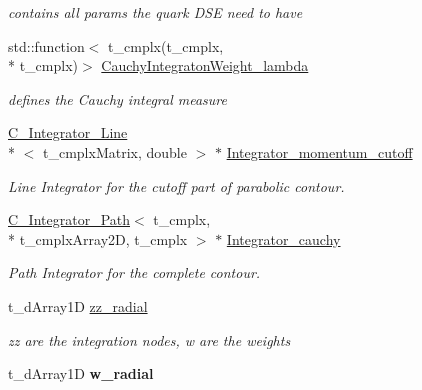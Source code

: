 \begin{DoxyCompactItemize}
\begin{DoxyCompactList}\small\item\em contains all params the quark D\-S\-E need to have \end{DoxyCompactList}\item 
\hypertarget{class_c___quark_a1dbb8f78522434bceefdb7b42aa1c96c}{std\-::function$<$ t\-\_\-cmplx(t\-\_\-cmplx, \\*
t\-\_\-cmplx)$>$ \hyperlink{class_c___quark_a1dbb8f78522434bceefdb7b42aa1c96c}{Cauchy\-Integraton\-Weight\-\_\-lambda}}\label{class_c___quark_a1dbb8f78522434bceefdb7b42aa1c96c}

\begin{DoxyCompactList}\small\item\em defines the Cauchy integral measure \end{DoxyCompactList}\item 
\hypertarget{class_c___quark_a551a3fc5de8f8b4d8bcb2502b503df41}{\hyperlink{class_c___integrator___line}{C\-\_\-\-Integrator\-\_\-\-Line}\\*
$<$ t\-\_\-cmplx\-Matrix, double $>$ $\ast$ \hyperlink{class_c___quark_a551a3fc5de8f8b4d8bcb2502b503df41}{Integrator\-\_\-momentum\-\_\-cutoff}}\label{class_c___quark_a551a3fc5de8f8b4d8bcb2502b503df41}

\begin{DoxyCompactList}\small\item\em Line Integrator for the cutoff part of parabolic contour. \end{DoxyCompactList}\item 
\hypertarget{class_c___quark_aaa4541680e33e880aa95591e9df3be44}{\hyperlink{class_c___integrator___path}{C\-\_\-\-Integrator\-\_\-\-Path}$<$ t\-\_\-cmplx, \\*
t\-\_\-cmplx\-Array2\-D, t\-\_\-cmplx $>$ $\ast$ \hyperlink{class_c___quark_aaa4541680e33e880aa95591e9df3be44}{Integrator\-\_\-cauchy}}\label{class_c___quark_aaa4541680e33e880aa95591e9df3be44}

\begin{DoxyCompactList}\small\item\em Path Integrator for the complete contour. \end{DoxyCompactList}\item 
\hypertarget{class_c___quark_a6e1d141d7f38aba34e48fd51f4da95de}{t\-\_\-d\-Array1\-D \hyperlink{class_c___quark_a6e1d141d7f38aba34e48fd51f4da95de}{zz\-\_\-radial}}\label{class_c___quark_a6e1d141d7f38aba34e48fd51f4da95de}

\begin{DoxyCompactList}\small\item\em zz are the integration nodes, w are the weights \end{DoxyCompactList}\item 
\hypertarget{class_c___quark_a0b5346b639ac43652861f2210a73676b}{t\-\_\-d\-Array1\-D {\bfseries w\-\_\-radial}}\label{class_c___quark_a0b5346b639ac43652861f2210a73676b}


\end{DoxyCompactItemize}
